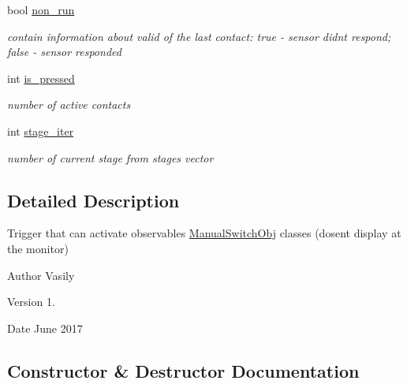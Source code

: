 \begin{DoxyCompactItemize}
\mbox{\label{class_sensor_a40badc87a0a663f3bcbc95867b6f6296}} 
bool \hyperlink{class_sensor_a40badc87a0a663f3bcbc95867b6f6296}{non\+\_\+run}
\begin{DoxyCompactList}\small\item\em contain information about valid of the last contact\+: \textquotesingle{}true\textquotesingle{} -\/ sensor didn\textquotesingle{}t respond; \textquotesingle{}false\textquotesingle{} -\/ sensor responded \end{DoxyCompactList}\item 
\mbox{\label{class_sensor_aff0be53ae0ed2e7f2a34e93bd78eed5d}} 
int \hyperlink{class_sensor_aff0be53ae0ed2e7f2a34e93bd78eed5d}{is\+\_\+pressed}
\begin{DoxyCompactList}\small\item\em number of active contacts \end{DoxyCompactList}\item 
\mbox{\label{class_sensor_aaf93d0f69a770e911edaf5f265eec623}} 
int \hyperlink{class_sensor_aaf93d0f69a770e911edaf5f265eec623}{stage\+\_\+iter}
\begin{DoxyCompactList}\small\item\em number of current stage from stages vector \end{DoxyCompactList}\end{DoxyCompactItemize}


\subsection{Detailed Description}
Trigger that can activate observables \hyperlink{class_manual_switch_obj}{Manual\+Switch\+Obj} classes (dosen\textquotesingle{}t display at the monitor) 

\begin{DoxyAuthor}{Author}
Vasily 
\end{DoxyAuthor}
\begin{DoxyVersion}{Version}
1. 
\end{DoxyVersion}
\begin{DoxyDate}{Date}
June 2017 
\end{DoxyDate}


\subsection{Constructor \& Destructor Documentation}
\mbox{\label{class_sensor_a7988853c8a9278171ce8956ccdde63c8}} 
